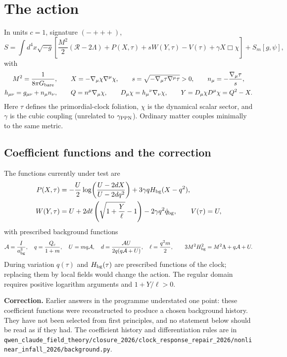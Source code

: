\documentclass[11pt,letterpaper]{article}
\begin{document}
\section{The action}
In units $c=1$, signature $(-+++)$,
\begin{equation}
S=\int d^4x\sqrt{-g}\left[\frac{M^2}{2}(\mathcal R-2\Lambda)+P(X,\tau)+sW(Y,\tau)-V(\tau)+\gamma X\Box\chi\right]+S_m[g,\psi],
\end{equation}
with
\begin{gather}
M^2=\frac{1}{8\pi G_{\rm bare}},\qquad X=-\nabla_\mu\chi\nabla^\mu\chi,\qquad s=\sqrt{-\nabla_\mu\tau\nabla^\mu\tau}>0,\qquad n_\mu=-\frac{\nabla_\mu\tau}{s},\\
h_{\mu\nu}=g_{\mu\nu}+n_\mu n_\nu,\qquad Q=n^\mu\nabla_\mu\chi,\qquad D_\mu\chi=h_\mu{}^\nu\nabla_\nu\chi,\qquad Y=D_\mu\chi D^\mu\chi=Q^2-X.
\end{gather}
Here $\tau$ defines the primordial-clock foliation, $\chi$ is the dynamical scalar sector, and $\gamma$ is the cubic coupling (unrelated to $\gamma_{\rm PPN}$). Ordinary matter couples minimally to the same metric.

\subsection{Coefficient functions and the correction}\label{sec:coeff}
The functions currently under test are
\begin{align}
P(X,\tau)&=-\frac{U}{2}\log\!\left(\frac{U-2dX}{U-2dq^2}\right)+3\gamma qH_{\rm bg}(X-q^2),\\
W(Y,\tau)&=U+2d\ell\left(\sqrt{1+\frac{Y}{\ell}}-1\right)-2\gamma q^2\dot q_{\rm bg},\qquad V(\tau)=U,
\end{align}
with prescribed background functions
\begin{equation}
\mathcal A=\frac{I}{a_{\rm bg}^3},\quad q=\frac{Q_c}{1+m},\quad U=mq\mathcal A,\quad d=\frac{\mathcal A U}{2q(q\mathcal A+U)},\quad \ell=\frac{q^2m}{2},\qquad 3M^2H_{\rm bg}^2=M^2\Lambda+q\mathcal A+U.
\end{equation}
During variation $q(\tau)$ and $H_{\rm bg}(\tau)$ are prescribed functions of the clock; replacing them by local fields would change the action. The regular domain requires positive logarithm arguments and $1+Y/\ell>0$.

\textbf{Correction.} Earlier answers in the programme understated one point: these coefficient functions were reconstructed to produce a chosen background history. They have not been selected from first principles, and no statement below should be read as if they had. The coefficient history and differentiation rules are in \texttt{qwen\_claude\_field\_theory/closure\_2026/clock\_response\_repair\_2026/nonlinear\_infall\_2026/background.py}.
\end{document}
